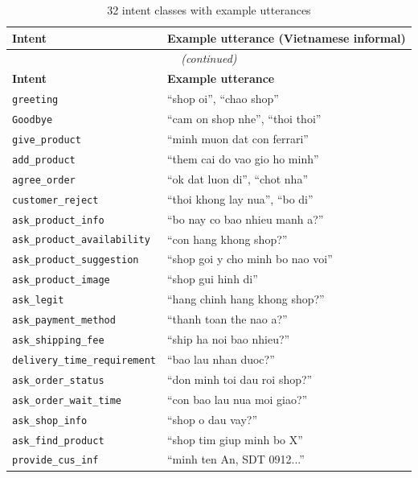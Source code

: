 \documentclass[12pt, a4paper]{report}
\begin{document}
\begin{longtable}{lX}
\caption{32 intent classes with example utterances} \label{tab:all_intents} \\
\toprule
\textbf{Intent} & \textbf{Example utterance (Vietnamese informal)} \\
\midrule
\endfirsthead
\multicolumn{2}{c}{\textit{(continued)}} \\
\toprule \textbf{Intent} & \textbf{Example utterance} \\ \midrule
\endhead
\bottomrule \endlastfoot
\texttt{greeting}                    & ``shop oi'', ``chao shop'' \\
\texttt{Goodbye}                     & ``cam on shop nhe'', ``thoi thoi'' \\
\texttt{give\_product}               & ``minh muon dat con ferrari'' \\
\texttt{add\_product}                & ``them cai do vao gio ho minh'' \\
\texttt{agree\_order}                & ``ok dat luon di'', ``chot nha'' \\
\texttt{customer\_reject}            & ``thoi khong lay nua'', ``bo di'' \\
\texttt{ask\_product\_info}          & ``bo nay co bao nhieu manh a?'' \\
\texttt{ask\_product\_availability}  & ``con hang khong shop?'' \\
\texttt{ask\_product\_suggestion}    & ``shop goi y cho minh bo nao voi'' \\
\texttt{ask\_product\_image}         & ``shop gui hinh di'' \\
\texttt{ask\_legit}                  & ``hang chinh hang khong shop?'' \\
\texttt{ask\_payment\_method}        & ``thanh toan the nao a?'' \\
\texttt{ask\_shipping\_fee}          & ``ship ha noi bao nhieu?'' \\
\texttt{delivery\_time\_requirement} & ``bao lau nhan duoc?'' \\
\texttt{ask\_order\_status}          & ``don minh toi dau roi shop?'' \\
\texttt{ask\_order\_wait\_time}      & ``con bao lau nua moi giao?'' \\
\texttt{ask\_shop\_info}             & ``shop o dau vay?'' \\
\texttt{ask\_find\_product}          & ``shop tim giup minh bo X'' \\
\texttt{provide\_cus\_inf}           & ``minh ten An, SDT 0912...'' \\

\end{longtable}
\end{document}
